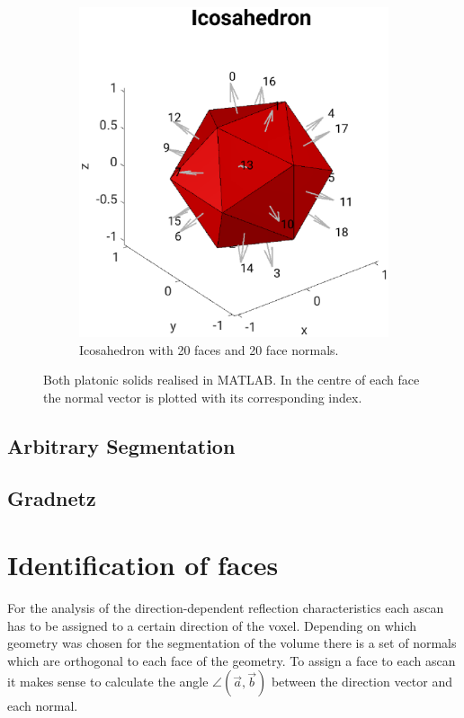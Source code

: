 \begin{figure}[H]
\begin{subfigure}[b]{0.47\textwidth}
         \includegraphics[width=1.2\textwidth]{Graphics/Icosahedron.eps}
         \caption{Icosahedron with 20 faces and 20 face normals.}
         \label{fig:Icosahedron_MATLAB}
     \end{subfigure}
        \caption{Both platonic solids realised in MATLAB. In the centre of each face the normal vector is plotted with its corresponding index. }
        \label{fig:platonic_solids_matlab}
\end{figure}


\subsection{Arbitrary Segmentation}
\label{chap:arbitrarySegment}


\subsection{Gradnetz}




\section{Identification of faces}
For the analysis of the direction-dependent reflection characteristics each \ac{ascan} has to be assigned to a certain direction of the voxel.
Depending on which geometry was chosen for the segmentation of the volume there is a set of normals which are orthogonal to each face of the geometry. To assign a face to each \ac{ascan} it makes sense to calculate the angle $\angle (\overrightarrow{a},\overrightarrow{b})$ between the direction vector and each normal.


